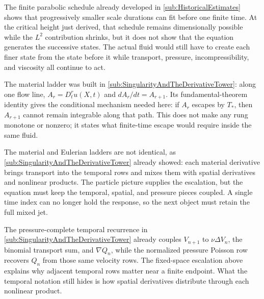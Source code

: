 
The finite parabolic schedule already developed in \cref{sub:HistoricalEstimates} shows that progressively smaller scale durations can fit before one finite time.
At the critical height just derived, that schedule remains dimensionally possible while the \(L^2\) contribution shrinks, but it does not show that the equation generates the successive states.
The actual fluid would still have to create each finer state from the state before it while transport, pressure, incompressibility, and viscosity all continue to act.

The material ladder was built in \cref{sub:SingularityAndTheDerivativeTower}: along one flow line, \(A_r=D_t^ru(X,t)\) and \(dA_r/dt=A_{r+1}\).
Its fundamental-theorem identity gives the conditional mechanism needed here: if \(A_r\) escapes by \(T_*\), then \(A_{r+1}\) cannot remain integrable along that path.
This does not make any rung monotone or nonzero; it states what finite-time escape would require inside the same fluid.

The material and Eulerian ladders are not identical, as \cref{sub:SingularityAndTheDerivativeTower} already showed: each material derivative brings transport into the temporal rows and mixes them with spatial derivatives and nonlinear products.
The particle picture supplies the escalation, but the equation must keep the temporal, spatial, and pressure pieces coupled.
A single time index can no longer hold the response, so the next object must retain the full mixed jet.

The pressure-complete temporal recurrence in \cref{sub:SingularityAndTheDerivativeTower} already couples \(V_{n+1}\) to \(\nu\Delta V_n\), the binomial transport sum, and \(\nabla Q_n\), while the normalized pressure Poisson row recovers \(Q_n\) from those same velocity rows.
The fixed-space escalation above explains why adjacent temporal rows matter near a finite endpoint.
What the temporal notation still hides is how spatial derivatives distribute through each nonlinear product.
